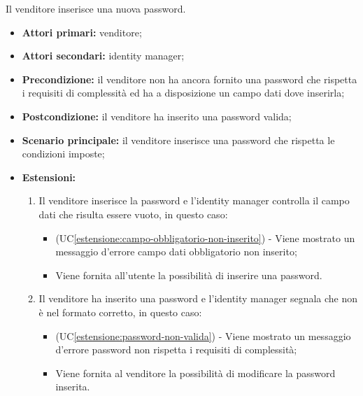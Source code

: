 Il venditore inserisce una nuova password.
\begin{itemize}
	\item \textbf{Attori primari:} venditore;
	\item \textbf{Attori secondari:} identity manager;
	\item \textbf{Precondizione:} il venditore non ha ancora fornito una password che rispetta i requisiti di complessità ed ha a disposizione un campo dati dove inserirla;
	\item \textbf{Postcondizione:} il venditore ha inserito una password valida;
	\item \textbf{Scenario principale:} il venditore inserisce una password che rispetta le condizioni imposte;
	\item \textbf{Estensioni:}
	\begin{enumerate}[label=\lett]
		\item Il venditore inserisce la password e l'identity manager controlla il campo dati che risulta essere vuoto, in questo caso:
		\begin{itemize}
			\item (UC\ref{estensione:campo-obbligatorio-non-inserito}) - Viene mostrato un messaggio d'errore campo dati obbligatorio non inserito;
			\item Viene fornita all'utente la possibilità di inserire una password.
		\end{itemize}
		\item Il venditore ha inserito una password e l'identity manager segnala che non è nel formato corretto, in questo caso:
		\begin{itemize}
			\item (UC\ref{estensione:password-non-valida}) - Viene mostrato un messaggio d'errore password non rispetta i requisiti di complessità;
			\item Viene fornita al venditore la possibilità di modificare la password inserita.
		\end{itemize}
	\end{enumerate} 
\end{itemize}

\label{modifica-informazioni-venditore.password.conferma-nuova-password}

